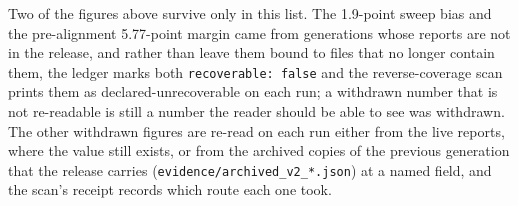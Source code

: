 \documentclass{article}
\newcommand{\ids}[1]{\texttt{\small #1}} %
\begin{document}
Two of the figures above survive only in this list. The 1.9-point sweep bias and the pre-alignment 5.77-point margin came from generations whose reports are not in the release, and rather than leave them bound to files that no longer contain them, the ledger marks both \texttt{recoverable: false} and the reverse-coverage scan prints them as declared-unrecoverable on each run; a withdrawn number that is not re-readable is still a number the reader should be able to see was withdrawn. The other withdrawn figures are re-read on each run either from the live reports, where the value still exists, or from the archived copies of the previous generation that the release carries (\ids{evidence/archived\_v2\_*.json}) at a named field, and the scan's receipt records which route each one took.
\end{document}
